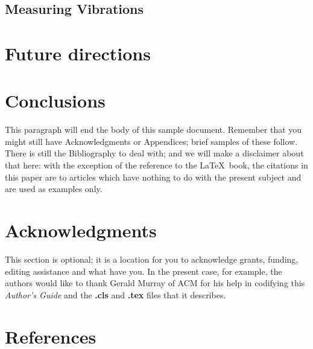 \documentclass{nime-alternate}
\begin{document}
\subsection{Measuring Vibrations}


\section{Future directions}

\section{Conclusions}
This paragraph will end the body of this sample document.
Remember that you might still have Acknowledgments or
Appendices; brief samples of these
follow.  There is still the Bibliography to deal with; and
we will make a disclaimer about that here: with the exception
of the reference to the \LaTeX\ book, the citations in
this paper are to articles which have nothing to
do with the present subject and are used as
examples only.

\section{Acknowledgments}
This section is optional; it is a location for you
to acknowledge grants, funding, editing assistance and
what have you.  In the present case, for example, the
authors would like to thank Gerald Murray of ACM for
his help in codifying this \textit{Author's Guide}
and the \textbf{.cls} and \textbf{.tex} files that it describes.

\section{References}
%

%
%
\end{document}
